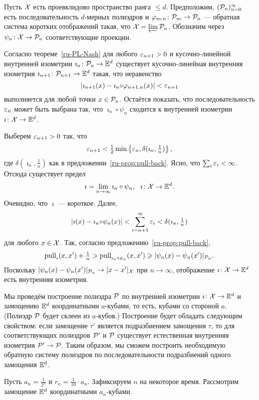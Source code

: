 \documentclass[oneside,a4paper]{article}
\begin{document}
Пусть $\mathcal{X}$ есть проевклидово пространство ранга $\le d$.
Предположим, $(\mathcal{P}_n)_{n=0}^\infty$ есть последовательность $d$-мерных полиэдров и  
$\varphi_{m,n}\colon \mathcal{P}_m\to \mathcal{P}_n$
--- обратная система коротких отображений такая, что $\mathcal{X}=\varprojlim \mathcal{P}_n$.
Обозначим через $\psi_n\colon\mathcal{X}\to \mathcal{P}_n$ соответствующие проекции.

Согласно теореме~\ref{ru-PL-Nash}
для любого $\varepsilon_{n+1}>0$ и кусочно-линейной внутренней изометрии $\imath_n\:\spc{P}_n\z\to \EE^d$
существует кусочно-линейная внутренняя изометрия 
$\imath_{n+1}\:\spc{P}_{n+1}\z\to \EE^d$ такая, что неравенство
$$|\imath_{n+1}(x)- \imath_{n}{\circ}\varphi_{n+1,n}(x)|<\varepsilon_{n+1}$$
выполняется для любой точки $x\in \mathcal{P}_n$.
Остаётся показать, что последовательность $\varepsilon_{n}$ может быть выбрана так, 
что $\imath_n{\circ}\psi_n$ сходится к внутренней изометрии $\imath\:\spc{X}\z\to\EE^d$.

Выберем  
$\varepsilon_{n+1}>0$ так, что 
$$\varepsilon_{n+1}<\tfrac12\min\left\{\varepsilon_n,\delta(\imath_n,\tfrac1n)\right\},$$
где $\delta(\imath_n,\tfrac1n)$ как в предложении~\ref{ru-prop:pull-back}.
Ясно, что $\sum_i\varepsilon_i<\infty$. 
Отсюда существует предел
$$\imath=\lim_{n\to\infty} \imath_n\circ\psi_n,\ \ \imath\colon\mathcal{X}\to\mathbb{E}^d.$$
Очевидно, что $\imath$ --- короткое.
Далее,
$$|\imath(x)- \imath_n{\circ}\psi_n(x)|< \sum_{i=n+1}^\infty\varepsilon_i<\delta(\imath_n,\tfrac1n)$$ 
для любого $x\in \mathcal{X}$.
Так, согласно предложению~\ref{ru-prop:pull-back},
$$\mathop{\rm pull}\nolimits_{\imath}(x,x')+\tfrac1n
>
\mathop{\rm pull}\nolimits_{\imath_n\circ\psi_n}(x,x')
\geqslant
|\psi_n(x)-\psi_n(x')|_{\mathcal{P}_n}.$$
Поскольку $|\psi_n(x)-\psi_n(x')|_{\mathcal{P}_n}\to |x-x'|_{\mathcal{X}}$ при $n\to\infty$, отображение $\imath\colon\mathcal{X}\to\mathbb{E}^d$ есть внутренняя изометрия.\qeds


Мы проведём построение полиэдра $\mathcal{P}$ 
по внутренней изометрии $\imath\colon \mathcal{X}\to \mathbb{E}^d$ и замощению $\mathbb{E}^d$ координатными $a$-кубами,
то есть, кубами со стороной $a$.
(Полиэдр $\mathcal{P}$ будет склеен из $a$-кубов.)
Построение будет обладать следующим свойством:
если замощение $\tau'$ является подразбиением замощения $\tau$, то для соответствующих полиэдров $\mathcal{P}'$ и $\mathcal{P}$ существует естественная внутренняя изометрия $\mathcal{P}'\to \mathcal{P}$. 
Таким образом, мы сможем построить необходимую обратную систему полиэдров по последовательности подразбиений одного замощения $\mathbb{E}^d$.

Пусть $a_n=\tfrac{1}{2^{n}}$ и $r_n=\tfrac{1}{10}\cdot a_n$.
Зафиксируем $n$ на некоторое время.
Рассмотрим замощение $\mathbb{E}^d$ координатными $a_n$-кубами.
\end{document}

